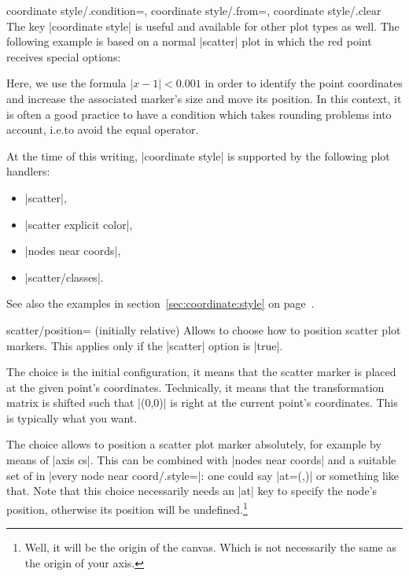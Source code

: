 {\begin{pgfplotskeylist}{%
    coordinate style/.condition=,
    coordinate style/.from=,
    coordinate style/.clear%
}
    The key |coordinate style| is useful and available for other plot types as
    well. The following example is based on a normal |scatter| plot in which
    the red point receives special options:
\begin{codeexample}[]
\end{codeexample}
    Here, we use the formula $\lvert x-1 \rvert < 0.001$ in order to identify
    the point coordinates and increase the associated marker's size and move
    its position. In this context, it is often a good practice to have a
    condition which takes rounding problems into account, i.e.\@ to avoid the
    equal operator.

    At the time of this writing, |coordinate style| is supported by the
    following plot handlers:
    \begin{itemize}
        \item |scatter|,
        \item |scatter explicit color|,
        \item |nodes near coords|,
        \item |scatter/classes|.
    \end{itemize}

    See also the examples in section~\ref{sec:coordinate:style} on
    page~\pageref{sec:coordinate:style}.
\end{pgfplotskeylist}

\begin{pgfplotskey}{scatter/position= (initially relative)}
    Allows to choose how to position scatter plot markers. This applies only if
    the |scatter| option is |true|.

    The choice  is the initial configuration, it means
    that the scatter marker is placed at the given point's coordinates.
    Technically, it means that the transformation matrix is shifted such that
    |(0,0)| is right at the current point's coordinates. This is typically what
    you want.

    The choice  allows to position a scatter plot marker
    absolutely, for example by means of |axis cs|. This can be combined with
    |nodes near coords| and a suitable set of  in
    |every node near coord/.style=|: one could say
    |at={(\coordindex,)}| or something like that. Note that this
    choice necessarily needs an |at| key to specify the node's position,
    otherwise its position will be undefined.\footnote{Well, it will be the
    origin of the canvas. Which is not necessarily the same as the origin of
    your axis.}
\end{pgfplotskey}

}
